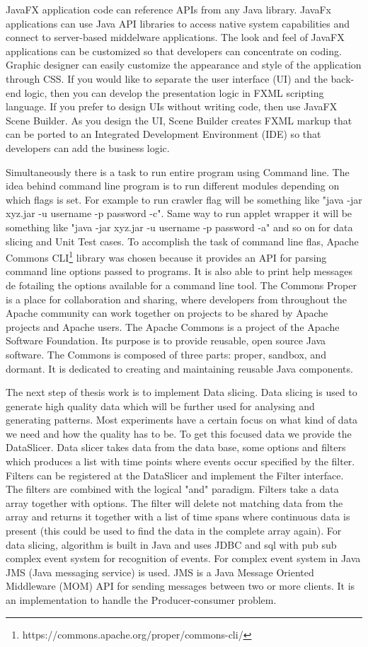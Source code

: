 \documentclass[article,type=msc,colorback,accentcolor=tud9c,twoside,11pt]{tudthesis}
\begin{document}
JavaFX application code can reference APIs from any Java library. JavaFx applications can use Java API libraries to access native system capabilities and connect to server-based middelware applications. The look and feel of JavaFX applications can be customized so that developers can concentrate on coding. Graphic designer can easily customize the appearance and style of the application through CSS. If you would like to separate the user interface (UI) and the back-end logic, then you can develop the presentation logic in FXML scripting language. If you prefer to design UIs without writing code, then use JavaFX Scene Builder. As you design the UI, Scene Builder creates FXML markup that can be ported to an Integrated Development Environment (IDE) so that developers can add the business logic.

Simultaneously there is a task to run entire program using Command line. The idea behind command line program is to run different modules depending on which flags is set. For example to run crawler flag will be something like "java -jar xyz.jar -u username -p password -c". Same way to run applet wrapper it will be something like  "java -jar xyz.jar -u username -p password -a" and so on for data slicing and Unit Test cases. To accomplish the task of command line flas, Apache Commons CLI\footnote{https://commons.apache.org/proper/commons-cli/} library was chosen because it provides an API for parsing command line options passed to programs. It is also able to print help messages de fotailing the options available for a command line tool. The Commons Proper is a place for collaboration and sharing, where developers from throughout the Apache community can work together on projects to be shared by Apache projects and Apache users. The Apache Commons is a project of the Apache Software Foundation. Its purpose is to provide reusable, open source Java software. The Commons is composed of three parts: proper, sandbox, and dormant. It is dedicated to creating and maintaining reusable Java components.

The next step of thesis work is to implement Data slicing. Data slicing is used to generate high quality data which will be further used for analysing and generating patterns. Most experiments have a certain focus on what kind of data we need and how the quality has to be. To get this focused data we provide the DataSlicer. Data slicer takes data from the data base, some options and filters which produces a list with time points where events occur specified by the filter. Filters can be registered at the DataSlicer and implement the Filter interface. The filters are combined with the logical "and" paradigm. Filters take a data array together with options. The filter will delete not matching data from the array and returns it together with a list of time spans where continuous data is present (this could be used to find the data in the complete array again). For data  slicing, algorithm is built in Java and uses JDBC and sql with pub sub complex event system for recognition of events. For complex event system in Java JMS (Java messaging service) is used. JMS is a Java Message Oriented Middleware (MOM) API for sending messages between two or more clients. It is an implementation to handle the Producer-consumer problem.
\end{document}
